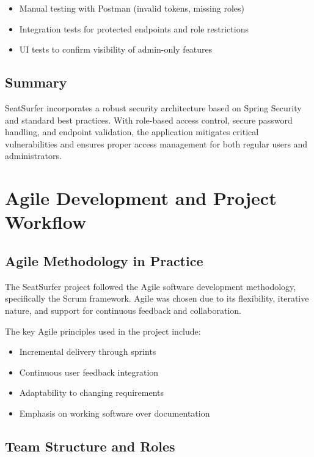 \documentclass[12pt,a4paper]{report}
\begin{document}
\begin{itemize}
    \item Manual testing with Postman (invalid tokens, missing roles)
    \item Integration tests for protected endpoints and role restrictions
    \item UI tests to confirm visibility of admin-only features
\end{itemize}

\section{Summary}

SeatSurfer incorporates a robust security architecture based on Spring Security and standard best practices. With role-based access control, secure password handling, and endpoint validation, the application mitigates critical vulnerabilities and ensures proper access management for both regular users and administrators.

\newpage

\chapter{Agile Development and Project Workflow}

\section{Agile Methodology in Practice}

The SeatSurfer project followed the Agile software development methodology, specifically the Scrum framework. Agile was chosen due to its flexibility, iterative nature, and support for continuous feedback and collaboration.

The key Agile principles used in the project include:
\begin{itemize}
    \item Incremental delivery through sprints
    \item Continuous user feedback integration
    \item Adaptability to changing requirements
    \item Emphasis on working software over documentation
\end{itemize}

\section{Team Structure and Roles}
\end{document}
